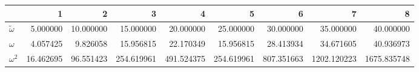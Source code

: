 \begin{tabular}{lrrrrrrrr}
\toprule
{} &          1 &          2 &           3 &           4 &           5 &           6 &            7 &            8 \\
\midrule
$\tilde \omega$ &   5.000000 &  10.000000 &   15.000000 &   20.000000 &   25.000000 &   30.000000 &    35.000000 &    40.000000 \\
$\omega$        &   4.057425 &   9.826058 &   15.956815 &   22.170349 &   15.956815 &   28.413934 &    34.671605 &    40.936973 \\
$\omega^2$      &  16.462695 &  96.551423 &  254.619961 &  491.524375 &  254.619961 &  807.351663 &  1202.120223 &  1675.835748 \\
\bottomrule
\end{tabular}
